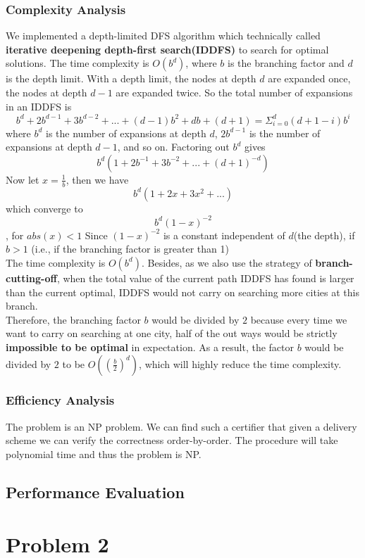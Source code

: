 \documentclass{llncs}
\begin{document}
\subsubsection{Complexity Analysis}
We implemented a depth-limited DFS algorithm which technically called \textbf{iterative deepening depth-first search(IDDFS)} to search for optimal solutions. 
The time complexity is $O(b^d)$, where $b$ is the branching factor and $d$ is the depth limit.
With a depth limit, the nodes at depth $d$ are expanded once, the nodes at depth $d-1$ are expanded twice. So the total number of expansions in an IDDFS is
$$b^d + 2b^{d-1} + 3b^{d-2} + ... + (d-1)b^2 + db + (d+1) = \Sigma_{i=0}^{d} (d + 1 - i)b^i$$
where $b^d$ is the number of expansions at depth $d$, $2b^{d-1}$ is the number of expansions at depth $d-1$, and so on. Factoring out $b^d$ gives
$$b^d(1 + 2b^{-1} + 3 b^{-2} + ... + (d + 1)^{-d})$$
Now let $x = \frac{1}{b}$, then we have 
$$b^d(1 + 2x + 3x^2 + ... )$$ which converge to 
$$b^d(1 - x)^{-2}$$, for $abs(x) < 1$
Since $(1-x)^{-2}$ is a constant independent of $d$(the depth), if $b > 1$ (i.e., if the branching factor is greater than 1)\\
The time complexity is $O(b^d)$.
Besides, as we also use the strategy of \textbf{branch-cutting-off}, when the total value of the current path IDDFS has found is larger than the current optimal, IDDFS would not carry on searching more cities at this branch.\\
Therefore, the branching factor $b$ would be divided by $2$ because every time we want to carry on searching at one city, half of the out ways would be strictly \textbf{impossible to be optimal} in expectation. As a result, the factor $b$ would be divided by $2$ to be $O((\frac{b}{2})^d)$, which will highly reduce  the time complexity. 
\subsubsection{Efficiency Analysis}
The problem is an NP problem. We can find such a certifier that given a delivery scheme we can verify the correctness order-by-order. The procedure will take polynomial time and thus the problem is NP.
\subsection{Performance Evaluation}

\section{Problem 2}
\end{document}
